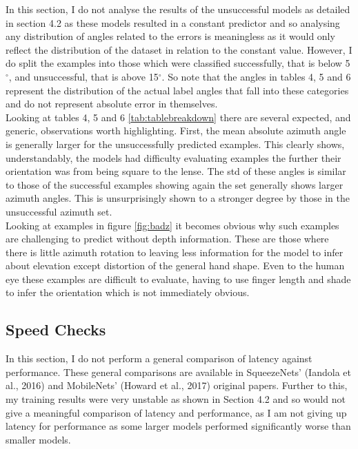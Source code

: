 \documentclass{article}
\begin{document}
{\begin{figure}[h]
\end{figure}



In this section, I do not analyse the results of the unsuccessful models as detailed in section 4.2 as these models resulted in a constant predictor and so analysing any distribution of angles related to the errors is meaningless as it would only reflect the distribution of the dataset in relation to the constant value. However, I do split the examples into those which were classified successfully, that is below 5 $^{\circ}$, and unsuccessful, that is above 15$^{\circ}$. So note that the angles in tables 4, 5 and 6 represent the distribution of the actual label angles that fall into these categories and do not represent absolute error in themselves.\\

Looking at tables 4, 5 and 6 \ref{tab:tablebreakdown} there are several expected, and generic, observations worth highlighting. First, the mean absolute azimuth angle is generally larger for the unsuccessfully predicted examples. This clearly shows, understandably, the models had difficulty evaluating examples the further their orientation was from being square to the lense. The std of these angles is similar to those of the successful examples showing again the set generally shows larger azimuth angles. 
This is unsurprisingly shown to a stronger degree by those in the unsuccessful azimuth set. \\

Looking at examples in figure \ref{fig:badz} it becomes obvious why such examples are challenging to predict without depth information. These are those where there is little azimuth rotation to leaving less information for the model to infer about elevation except distortion of the general hand shape. Even to the human eye these examples are difficult to evaluate, having to use finger length and shade to infer the orientation which is not immediately obvious.  \\


\subsection{Speed Checks}
In this section, I do not perform a general comparison of latency against performance. These general comparisons are available in SqueezeNets' (Iandola et al., 2016) and MobileNets' (Howard et al., 2017) original papers. Further to this, my training results were very unstable as shown in Section 4.2 and so would not give a meaningful comparison of latency and performance, as I am not giving up latency for performance as some larger models performed significantly worse than smaller models. \\

}
\end{document}
